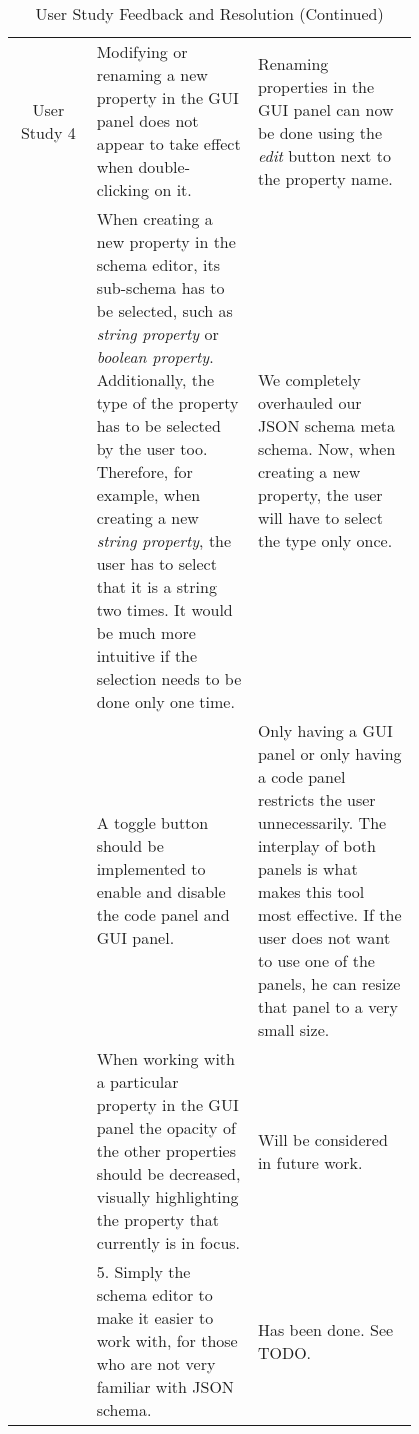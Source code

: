 \begin{table*}

    \centering
    \small %
    \setlength{\extrarowheight}{5pt} %
    \renewcommand{\arraystretch}{1.5} %
    \begin{tabular}{|c|p{0.4\linewidth}|p{0.4\linewidth}|}
        \hline
        User Study 4 & Modifying or renaming a new property in the GUI panel does not appear to take effect when double-clicking on it. &
        Renaming properties in the GUI panel can now be done using the \textit{edit} button next to the property name. \\
        \cline{2-3}
        & When creating a new property in the schema editor, its sub-schema has to be selected, such as \textit{string property} or \textit{boolean property}.
        Additionally, the type of the property has to be selected by the user too.
        Therefore, for example, when creating a new \textit{string property}, the user has to select that it is a string two times.
        It would be much more intuitive if the selection needs to be done only one time.
        & We completely overhauled our JSON schema meta schema.
        Now, when creating a new property, the user will have to select the type only once. \\
        \cline{2-3}
        & A toggle button should be implemented to enable and disable the code panel and GUI panel.
        & Only having a GUI panel or only having a code panel restricts the user unnecessarily.
        The interplay of both panels is what makes this tool most effective.
         If the user does not want to use one of the panels, he can resize that panel to a very small size.  \\
        \cline{2-3}
        & When working with a particular property in the GUI panel the opacity of the other properties should be decreased, visually highlighting the property that currently is in focus. & Will be considered in future work. \\
        \cline{2-3}
        & 5. Simply the schema editor to make it easier to work with, for those who are not very familiar with JSON schema. &
        Has been done. See TODO. \\
        \hline

    \end{tabular}
    \caption{User Study Feedback and Resolution (Continued)} \label{tab:user_study4}

\end{table*}

